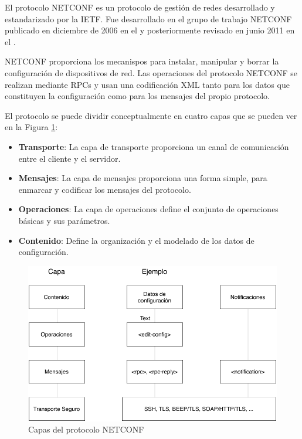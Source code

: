 El protocolo \gls{NETCONF} es un protocolo de gestión de redes desarrollado y estandarizado por la \gls{IETF}. Fue desarrollado en el grupo de trabajo NETCONF publicado en diciembre de 2006 en el  y posteriormente revisado en junio 2011 en el . 

\gls{NETCONF} proporciona los mecanispos para instalar, manipular y borrar la configuración de dispositivos de red. Las operaciones del protocolo \gls{NETCONF} se realizan mediante \glspl{RPC} y usan una codificación \gls{XML} tanto para los datos que constituyen la configuración como para los mensajes del propio protocolo. 

El protocolo se puede dividir conceptualmente en cuatro capas que se pueden ver en la Figura \ref{fig:capas_netconf}:
\begin{itemize}
    \item \textbf{Transporte}: La capa de transporte proporciona un canal de comunicación entre el cliente y el servidor.
    \item \textbf{Mensajes}: La capa de mensajes proporciona una forma simple, para enmarcar y codificar los mensajes del protocolo.
    \item \textbf{Operaciones}: La capa de operaciones define el conjunto de operaciones básicas y sus parámetros.
    \item \textbf{Contenido}: Define la organización y el modelado de los datos de configuración.
\end{itemize}

\begin{figure}
    \centering
    \includegraphics[scale=.75]{graphics/Capas_Netconf.pdf}
    \caption{Capas del protocolo \gls{NETCONF}}
    \label{fig:capas_netconf}
\end{figure}

